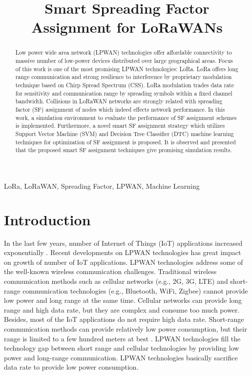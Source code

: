 \documentclass[conference]{IEEEtran}
\begin{document}
\title{Smart Spreading Factor Assignment for LoRaWANs}


\author{
}
\maketitle


\begin{abstract}
Low power wide area network (LPWAN) technologies offer affordable connectivity to massive number of low-power devices distributed over large geographical areas. Focus of this work is one of the most promising LPWAN technologies: LoRa. LoRa offers long range communication and strong resilience to interference by proprietary modulation technique based on Chirp Spread Spectrum (CSS). LoRa modulation trades data rate for sensitivity and communication range by spreading symbols within a fixed channel bandwidth. Collisions in LoRaWAN networks are strongly related with spreading factor (SF) assignment of nodes which indeed effects network performance. In this work, a simulation environment to evaluate the performance of SF assignment schemes is implemented. Furthermore, a novel smart SF assignment strategy which utilizes Support Vector Machine (SVM) and Decision Tree Classifier (DTC) machine learning techniques for optimization of SF assignment is proposed. It is observed and presented that the proposed smart SF assignment techniques give promising simulation results. 
\end{abstract}


\begin{IEEEkeywords}
LoRa, LoRaWAN, Spreading Factor, LPWAN, Machine Learning
\end{IEEEkeywords}


\section{Introduction}
\par In the last few years, number of Internet of Things (IoT) applications increased exponentially \cite{7721743}. Recent developments on LPWAN technologies has great impact on growth of number of IoT applications. LPWAN technologies address some of the well-known wireless communication challenges. Traditional wireless communication methods such as cellular networks (e.g., 2G, 3G, LTE) and short-range communication technologies (e.g., Bluetooth, WiFi, Zigbee) cannot provide low power and long range at the same time. Cellular networks can provide long range and high data rate, but they are complex and consume too much power. Besides, most of the IoT applications do not require high data rate. Short-range communication methods can provide relatively low power consumption, but their range is limited to a few hundred meters at best \cite{7815384}. LPWAN technologies fill the technology gap between short range and cellular technologies by providing low power and long-range communication. LPWAN technologies basically sacrifice data rate to provide low power consumption.
\end{document}
